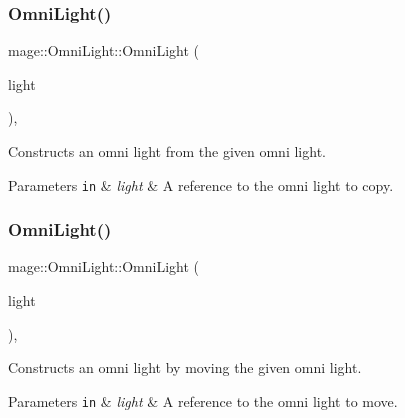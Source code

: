 \subsubsection{\texorpdfstring{Omni\+Light()}{OmniLight()}\hspace{0.1cm}{\footnotesize\ttfamily [2/3]}}
{\footnotesize\ttfamily mage\+::\+Omni\+Light\+::\+Omni\+Light (\begin{DoxyParamCaption}\item[{const \hyperlink{classmage_1_1_omni_light}{Omni\+Light} \&}]{light }\end{DoxyParamCaption})\hspace{0.3cm}{\ttfamily [default]}, {\ttfamily [noexcept]}}

Constructs an omni light from the given omni light.


\begin{DoxyParams}[1]{Parameters}
\mbox{\tt in}  & {\em light} & A reference to the omni light to copy. \\
\hline
\end{DoxyParams}
\hypertarget{classmage_1_1_omni_light_a541a41f6173c94833def1f30fa90fd6f}{}\label{classmage_1_1_omni_light_a541a41f6173c94833def1f30fa90fd6f} 
\subsubsection{\texorpdfstring{Omni\+Light()}{OmniLight()}\hspace{0.1cm}{\footnotesize\ttfamily [3/3]}}
{\footnotesize\ttfamily mage\+::\+Omni\+Light\+::\+Omni\+Light (\begin{DoxyParamCaption}\item[{\hyperlink{classmage_1_1_omni_light}{Omni\+Light} \&\&}]{light }\end{DoxyParamCaption})\hspace{0.3cm}{\ttfamily [default]}, {\ttfamily [noexcept]}}

Constructs an omni light by moving the given omni light.


\begin{DoxyParams}[1]{Parameters}
\mbox{\tt in}  & {\em light} & A reference to the omni light to move. \\
\hline
\end{DoxyParams}
\hypertarget{classmage_1_1_omni_light_af6f4921499b430041966f38aac920b69}{}\label{classmage_1_1_omni_light_af6f4921499b430041966f38aac920b69} 
